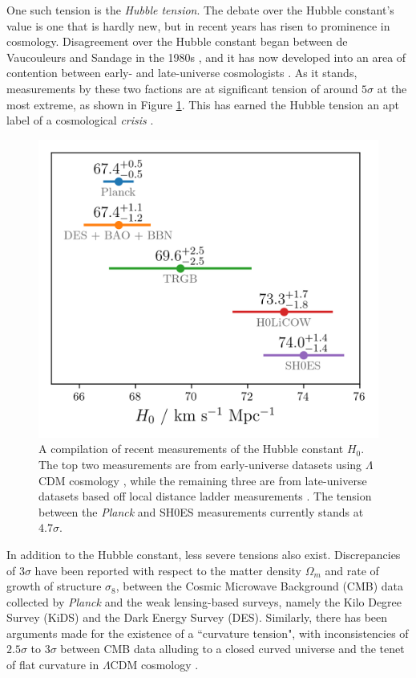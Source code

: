 \documentclass[%
 reprint,
 amsmath,amssymb,
 aps,
]{revtex4-2}
\begin{document}
One such tension is the \textit{Hubble tension}. The debate over the Hubble constant's value is one that is hardly new, but in recent years has risen to prominence in cosmology. Disagreement over the Hubble constant began between de Vaucouleurs and Sandage in the 1980s \cite{deVaucouleurs1986, Sandage1975}, and it has now developed into an area of contention between early- and late-universe cosmologists \cite{Planck2020, Abbott2018, Freedman2020, Riess2019, Wong2019}. As it stands, measurements by these two factions are at significant tension of around $5\sigma$ at the most extreme, as shown in Figure \ref{H0_tension}. This has earned the Hubble tension an apt label of a cosmological \textit{crisis} \cite{DiValentino2021}.


\begin{figure}
    \includegraphics[width=0.8\columnwidth]{../plots/H0 tension.png}
    \centering
    \caption{A compilation of recent measurements of the Hubble constant $H_0$. The top two measurements are from early-universe datasets using $\Lambda$CDM cosmology \cite{Planck2020, Abbott2018}, while the remaining three are from late-universe datasets based off local distance ladder measurements \cite{Freedman2020, Riess2019, Wong2019}. The tension between the \textit{Planck} and SH0ES measurements currently stands at $4.7 \sigma$.}
    \label{H0_tension}
\end{figure}


In addition to the Hubble constant, less severe tensions also exist. Discrepancies of $3\sigma$ have been reported with respect to the matter density $\Omega_m$ and rate of growth of structure $\sigma_8$, between the Cosmic Microwave Background (CMB) data collected by \textit{Planck} and the weak lensing-based surveys, namely the Kilo Degree Survey (KiDS) \cite{Heymans2021} and the Dark Energy Survey (DES). Similarly, there has been arguments made for the existence of a ``curvature tension", with inconsistencies of $2.5 \sigma$ to $3 \sigma$ between CMB data alluding to a closed curved universe and the tenet of flat curvature in $\Lambda$CDM cosmology \cite{Handley2021Closed}.
\end{document}

